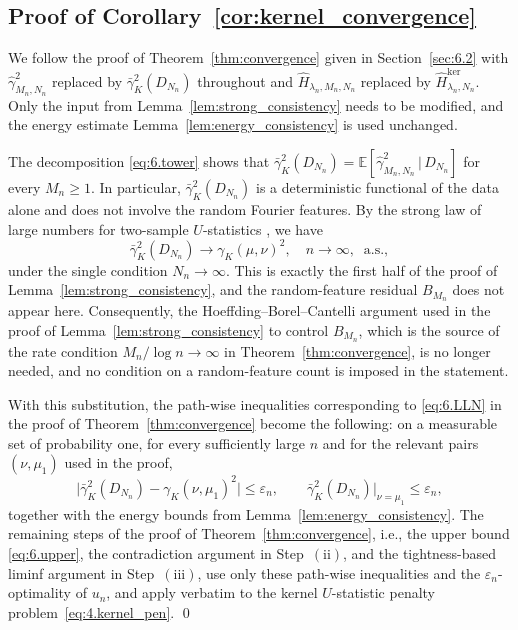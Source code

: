 \documentclass[11pt,leqno]{article}
\theoremstyle{plain}
\theoremstyle{remark}
\theoremstyle{definition}
\numberwithin{equation}{section}
\numberwithin{figure}{section}
\numberwithin{table}{section}
\numberwithin{algorithm}{section}
\newcommand{\EE}{\mathbb{E}}
\begin{document}
\subsection{Proof of Corollary~\ref{cor:kernel_convergence}}\label{sec:6.4ker}

We follow the proof of Theorem~\ref{thm:convergence} given in Section~\ref{sec:6.2}
with $\hat{\gamma}_{M_n,N_n}^2$ replaced by $\bar{\gamma}_K^2(D_{N_n})$ throughout
and $\hat{H}_{\lambda_n,M_n,N_n}$ replaced by $\hat{H}^{\mathrm{ker}}_{\lambda_n,N_n}$.
Only the input from Lemma~\ref{lem:strong_consistency} needs to be modified, and
the energy estimate Lemma~\ref{lem:energy_consistency} is used unchanged.

The decomposition \eqref{eq:6.tower} shows that
$\bar{\gamma}_K^2(D_{N_n}) = \EE[\hat{\gamma}_{M_n,N_n}^2\,|\,D_{N_n}]$ for every $M_n\ge 1$.
In particular, $\bar{\gamma}_K^2(D_{N_n})$ is a deterministic functional of the data alone
and does not involve the random Fourier features.
By the strong law of large numbers for two-sample $U$-statistics \cite[Section~5.4]{ser:1980}, we have
\[
 \bar{\gamma}_K^2(D_{N_n}) \longrightarrow \gamma_K(\mu,\nu)^2,  \quad n\to\infty, \;\;\text{a.s.},
\]
under the single condition $N_n\to\infty$.
This is exactly the first half of the proof of Lemma~\ref{lem:strong_consistency},
and the random-feature residual $B_{M_n}$ does not appear here.
Consequently, the Hoeffding--Borel--Cantelli argument used in the proof of Lemma~\ref{lem:strong_consistency}
to control $B_{M_n}$, which is the source of the rate condition $M_n/\log n\to\infty$ in Theorem~\ref{thm:convergence}, is no longer needed,
and no condition on a random-feature count is imposed in the statement.

With this substitution, the path-wise inequalities corresponding to \eqref{eq:6.LLN} in the proof of Theorem~\ref{thm:convergence} become the following:
on a measurable set of probability one, for every sufficiently large $n$ and for the relevant pairs $(\nu,\mu_1)$ used in the proof,
\[
 \bigl|\bar{\gamma}_K^2(D_{N_n}) - \gamma_K(\nu,\mu_1)^2\bigr|\le \varepsilon_n,
 \qquad
 \bar{\gamma}_K^2(D_{N_n})\bigr|_{\nu=\mu_1}\le \varepsilon_n,
\]
together with the energy bounds from Lemma~\ref{lem:energy_consistency}.
The remaining steps of the proof of Theorem~\ref{thm:convergence}, i.e., the upper bound \eqref{eq:6.upper},
the contradiction argument in Step~$(\mathrm{ii})$, and the tightness-based liminf argument in Step~$(\mathrm{iii})$,
use only these path-wise inequalities and the $\varepsilon_n$-optimality of $u_n$, and apply verbatim to the kernel $U$-statistic penalty problem~\eqref{eq:4.kernel_pen}.
\qed
\end{document}
